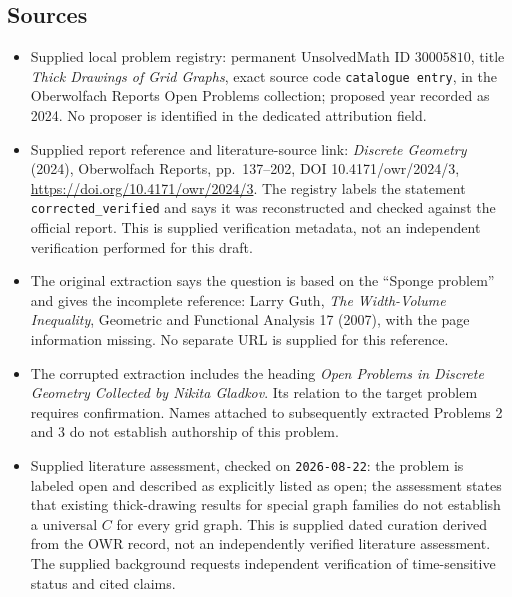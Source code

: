 \documentclass[11pt]{article}
\begin{document}
\subsection{Sources}
\begin{itemize}
\item Supplied local problem registry: permanent UnsolvedMath ID \(30005810\), title \emph{Thick Drawings of Grid Graphs}, exact source code \texttt{catalogue entry}, in the Oberwolfach Reports Open Problems collection; proposed year recorded as 2024. No proposer is identified in the dedicated attribution field.
\item Supplied report reference and literature-source link: \emph{Discrete Geometry} (2024), Oberwolfach Reports, pp.\ 137--202, DOI 10.4171/owr/2024/3, \url{https://doi.org/10.4171/owr/2024/3}. The registry labels the statement \texttt{corrected\_verified} and says it was reconstructed and checked against the official report. This is supplied verification metadata, not an independent verification performed for this draft.
\item The original extraction says the question is based on the ``Sponge problem'' and gives the incomplete reference: Larry Guth, \emph{The Width-Volume Inequality}, Geometric and Functional Analysis 17 (2007), with the page information missing. No separate URL is supplied for this reference.
\item The corrupted extraction includes the heading \emph{Open Problems in Discrete Geometry Collected by Nikita Gladkov}. Its relation to the target problem requires confirmation. Names attached to subsequently extracted Problems 2 and 3 do not establish authorship of this problem.
\item Supplied literature assessment, checked on \texttt{2026-08-22}: the problem is labeled open and described as explicitly listed as open; the assessment states that existing thick-drawing results for special graph families do not establish a universal \(C\) for every grid graph. This is supplied dated curation derived from the OWR record, not an independently verified literature assessment. The supplied background requests independent verification of time-sensitive status and cited claims.
\end{itemize}
\end{document}
